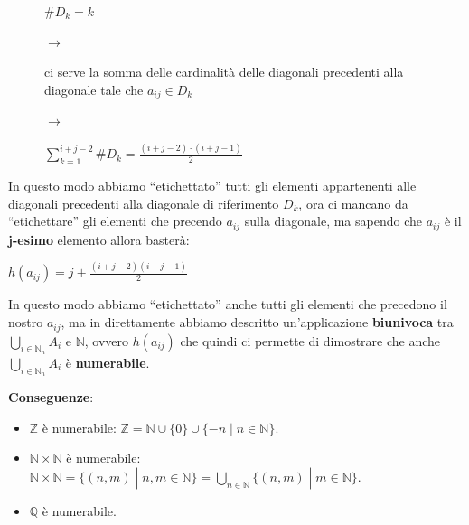 \begin{figure}[h]
    \centering
    \begin{minipage}[t]{0.15\textwidth}
        \centering
        $\#D_k = k$
    \end{minipage}
    $\rightarrow$
    \begin{minipage}[t]{0.4\textwidth}
        \centering
        ci serve la somma delle cardinalità delle diagonali precedenti alla diagonale tale che $a_{ij} \in D_k$
    \end{minipage}
    $\rightarrow$
    \begin{minipage}[t]{0.35\textwidth}
        \centering
        $\sum^{i+j-2}_{k=1} \#D_k = \frac{(i + j - 2) \cdot (i + j - 1)}{2}$
    \end{minipage}
\end{figure}
In questo modo abbiamo ``etichettato'' tutti gli elementi appartenenti alle diagonali precedenti alla diagonale di riferimento $D_k$, ora ci mancano da ``etichettare'' gli elementi che precendo $a_{ij}$ sulla diagonale, ma sapendo che $a_{ij}$ è il \textbf{j-esimo} elemento allora basterà:
\begin{center}
    $h(a_{ij}) = j + \frac{(i + j - 2)(i + j - 1)}{2}$
\end{center}
In questo modo abbiamo ``etichettato'' anche tutti gli elementi che precedono il nostro $a_{ij}$, ma in direttamente abbiamo descritto un'applicazione \textbf{biunivoca} tra $\bigcup_{i \in \mathbb{N}_n} A_i$ e $\mathbb{N}$, ovvero $h(a_{ij})$ che quindi ci permette di dimostrare che anche $\bigcup_{i \in \mathbb{N}_n} A_i$ è \textbf{numerabile}.

\textbf{Conseguenze}:
\begin{itemize}[nosep]
    \item $\mathbb{Z}$ è numerabile: $\mathbb{Z} = \mathbb{N} \cup \{0\} \cup \{ -n \; | \; n \in \mathbb{N}\}$.
    \item $\mathbb{N} \times \mathbb{N}$ è numerabile: $\mathbb{N} \times \mathbb{N} = \{(n, m) \; | \; n, m \in \mathbb{N}\} = \bigcup_{n \in \mathbb{N}} \{(n, m) \; | \; m \in \mathbb{N}\}$.
    \item $\mathbb{Q}$ è numerabile.
\end{itemize}


